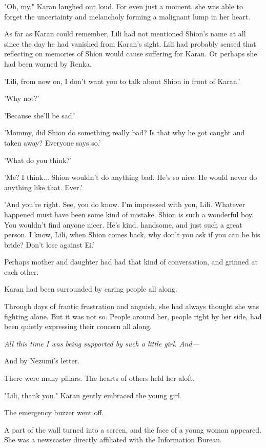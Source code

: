 "Oh, my." Karan laughed out loud. For even just a moment, she was able
to forget the uncertainty and melancholy forming a malignant lump in her
heart.

As far as Karan could remember, Lili had not mentioned Shion's name at
all since the day he had vanished from Karan's sight. Lili had probably
sensed that reflecting on memories of Shion would cause suffering for
Karan. Or perhaps she had been warned by Renka.

'Lili, from now on, I don't want you to talk about Shion in front of
Karan.'

'Why not?'

'Because she'll be sad.'

'Mommy, did Shion do something really bad? Is that why he got caught and
taken away? Everyone says so.'

'What do you think?'

'Me? I think... Shion wouldn't do anything bad. He's so nice. He would
never do anything like that. Ever.'

'And you're right. See, you do know. I'm impressed with you, Lili.
Whatever happened must have been some kind of mistake. Shion is such a
wonderful boy. You wouldn't find anyone nicer. He's kind, handsome, and
just such a great person. I know, Lili, when Shion comes back, why don't
you ask if you can be his bride? Don't lose against Ei.'

Perhaps mother and daughter had had that kind of conversation, and
grinned at each other.

Karan had been surrounded by caring people all along.

Through days of frantic frustration and anguish, she had always thought
she was fighting alone. But it was not so. People around her, people
right by her side, had been quietly expressing their concern all along.

\emph{All this time I was being supported by such a little girl. And---}


And by Nezumi's letter.

There were many pillars. The hearts of others held her aloft.

"Lili, thank you." Karan gently embraced the young girl.

The emergency buzzer went off.

A part of the wall turned into a screen, and the face of a young woman
appeared. She was a newscaster directly affiliated with the Information
Bureau.

